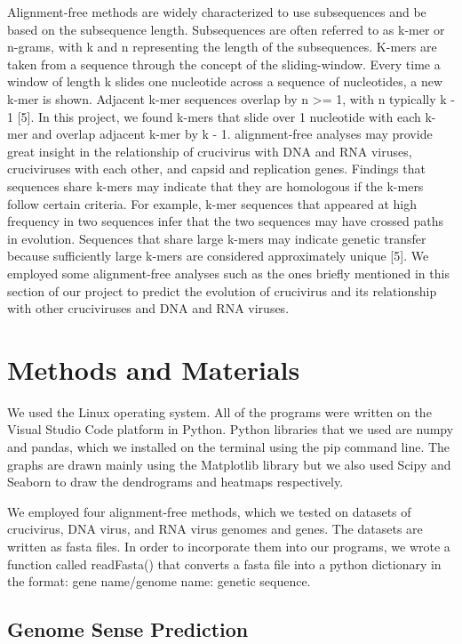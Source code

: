 \documentclass[eng]{ajceam-class}
\begin{document}
Alignment-free methods are widely characterized to use subsequences and be based on the subsequence length. Subsequences are often referred to as k-mer or n-grams, with k and n representing the length of the subsequences. K-mers are taken from a sequence through the concept of the sliding-window. Every time a window of length k slides one nucleotide across a sequence of nucleotides, a new k-mer is shown. Adjacent k-mer sequences overlap by n >= 1, with n typically k - 1 [5]. In this project, we found k-mers that slide over 1 nucleotide with each k-mer and overlap adjacent k-mer by k - 1. alignment-free analyses may provide great insight in the relationship of crucivirus with DNA and RNA viruses, cruciviruses with each other, and capsid and replication genes. Findings that sequences share k-mers may indicate that they are homologous if the k-mers follow certain criteria. For example, k-mer sequences that appeared at high frequency in two sequences infer that the two sequences may have crossed paths in evolution. Sequences that share large k-mers may indicate genetic transfer because sufficiently large k-mers are considered approximately unique [5]. We employed some alignment-free analyses such as the ones briefly mentioned in this section of our project to predict the evolution of crucivirus and its relationship with other cruciviruses and DNA and RNA viruses.

\section{Methods and Materials}

We used the Linux operating system. All of the programs were written on the Visual Studio Code platform in Python. Python libraries that we used are numpy and pandas, which we installed on the terminal using the pip command line. The graphs are drawn mainly using the Matplotlib library but we also used Scipy and Seaborn to draw the dendrograms and heatmaps respectively. 

We employed four alignment-free methods, which we tested on datasets of crucivirus, DNA virus, and RNA virus genomes and genes. The datasets are written as fasta files. In order to incorporate them into our programs, we wrote a function called readFasta() that converts a fasta file into a python dictionary in the format: gene name/genome name: genetic sequence.

\subsection{Genome Sense Prediction}
\end{document}
